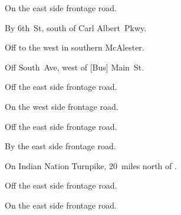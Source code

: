 
\begin{LocationList}

On the east side  frontage road.

By 6th~St, south of  Carl Albert~Pkwy.

Off  to the west in southern McAlester.

Off South~Ave, west of [Bus] Main~St.

\Location{\GarageHQ \Garage}
Off the east side  frontage road.

On the west side  frontage road.

Off the east side  frontage road.

By the east side  frontage road.

\Location{\TruckStop \Gas \Rest}
On  Indian Nation Turnpike, 20~miles north of .

Off the east side  frontage road.

On the east side  frontage road.

\end{LocationList}
